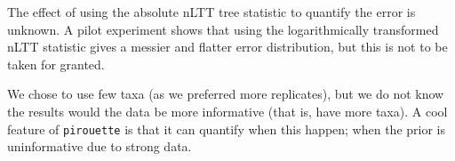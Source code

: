 The effect of using the absolute nLTT tree statistic to quantify the error
is unknown. A pilot experiment  shows that
using the logarithmically transformed nLTT statistic gives a messier and
flatter error distribution, but this is not to be taken for granted.

We chose to use few taxa (as we preferred more replicates), but we do not
know the results would the data be more informative (that is, have more taxa).
A cool feature of \verb;pirouette; is that it can quantify when this happen;
when the prior is uninformative due to strong data.

